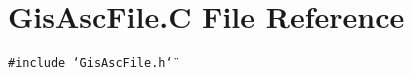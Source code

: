 \hypertarget{GisAscFile_8C}{
\section{Gis\-Asc\-File.C File Reference}
\label{GisAscFile_8C}
}
{\tt \#include \char`\"{}Gis\-Asc\-File.h\char`\"{}}\par
